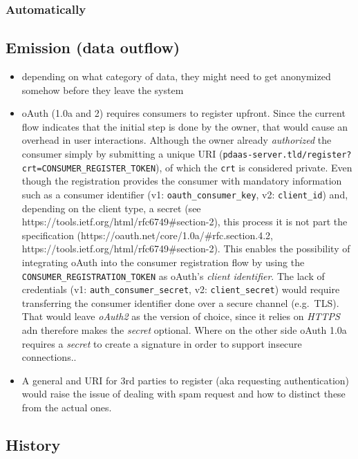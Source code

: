 \documentclass[12pt,english,a4paper,titlepage,cleardoublepage=empty,dottedtoc]{report}
\begin{document}
\subsubsection{Automatically}\label{automatically}

\subsection{Emission (data outflow)}\label{emission-data-outflow}

\begin{itemize}
\item
  depending on what category of data, they might need to get anonymized
  somehow before they leave the system
\item
  oAuth (1.0a and 2) requires consumers to register upfront. Since the
  current flow indicates that the initial step is done by the owner,
  that would cause an overhead in user interactions. Although the owner
  already \emph{authorized} the consumer simply by submitting a unique
  URI
  (\texttt{pdaas-server.tld/register?crt=CONSUMER\_REGISTER\_TOKEN}), of
  which the \texttt{crt} is considered private. Even though the
  registration provides the consumer with mandatory information such as
  a consumer identifier (v1: \texttt{oauth\_consumer\_key}, v2:
  \texttt{client\_id}) and, depending on the client type, a secret (see
  https://tools.ietf.org/html/rfc6749\#section-2), this process it is
  not part the specification
  (https://oauth.net/core/1.0a/\#rfc.section.4.2,
  https://tools.ietf.org/html/rfc6749\#section-2). This enables the
  possibility of integrating oAuth into the consumer registration flow
  by using the \texttt{CONSUMER\_REGISTRATION\_TOKEN} as oAuth's
  \emph{client identifier}. The lack of credentials (v1:
  \texttt{auth\_consumer\_secret}, v2: \texttt{client\_secret}) would
  require transferring the consumer identifier done over a secure
  channel (e.g.~TLS). That would leave \emph{oAuth2} as the version of
  choice, since it relies on \emph{HTTPS} adn therefore makes the
  \emph{secret} optional. Where on the other side oAuth 1.0a requires a
  \emph{secret} to create a signature in order to support insecure
  connections..
\item
  A general and URI for 3rd parties to register (aka requesting
  authentication) would raise the issue of dealing with spam request and
  how to distinct these from the actual ones.
\end{itemize}

\subsection{History}\label{history}
\end{document}
